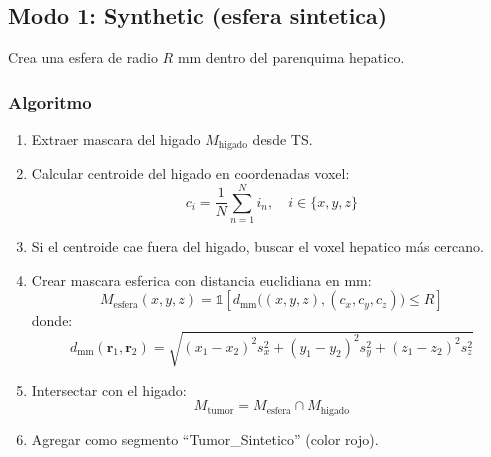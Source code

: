 \documentclass[12pt,a4paper]{article}
\begin{document}
\subsection{Modo 1: Synthetic (esfera sintetica)}

Crea una esfera de radio $R$ mm dentro del parenquima hepatico.

\subsubsection{Algoritmo}

\begin{enumerate}
    \item Extraer mascara del higado $M_{\text{higado}}$ desde TS.
    \item Calcular centroide del higado en coordenadas voxel:
          \begin{equation}\label{eq:centroide}
              c_i = \frac{1}{N} \sum_{n=1}^{N} i_n,\quad i \in \{x, y, z\}
          \end{equation}
    \item Si el centroide cae fuera del higado, buscar el voxel hepatico más cercano.
    \item Crear mascara esferica con distancia euclidiana en mm:
          \begin{equation}\label{eq:esfera}
              M_{\text{esfera}}(x,y,z) = \mathbb{1}\left[
              d_{\text{mm}}\big((x,y,z), (c_x,c_y,c_z)\big) \leq R
              \right]
          \end{equation}
          donde:
          \begin{equation}\label{eq:dist_mm}
              d_{\text{mm}}(\mathbf{r}_1, \mathbf{r}_2) = \sqrt{
              (x_1-x_2)^2 s_x^2 + (y_1-y_2)^2 s_y^2 + (z_1-z_2)^2 s_z^2}
          \end{equation}
    \item Intersectar con el higado:
          \begin{equation}\label{eq:tumor_mask}
              M_{\text{tumor}} = M_{\text{esfera}} \cap M_{\text{higado}}
          \end{equation}
    \item Agregar como segmento ``Tumor\_Sintetico'' (color rojo).
\end{enumerate}
\end{document}

